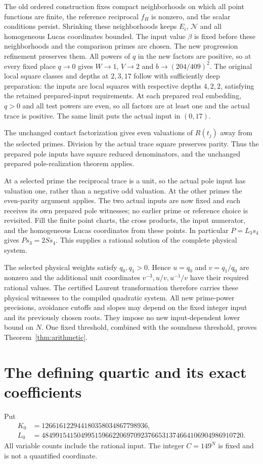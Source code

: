 \documentclass[11pt,a4paper]{article}
\begin{document}
The old ordered construction fixes compact neighborhoods on which all
point functions are finite, the reference reciprocal $f_H$ is nonzero,
and the scalar conditions persist. Shrinking these neighborhoods keeps
$E_i$, $\mathcal N$ and all homogeneous Lucas coordinates bounded.
The input value $\beta$ is fixed before these neighborhoods and the
comparison primes are chosen. The new progression refinement
preserves them. All powers of $q$ in the new factors are positive,
so at every fixed place $q\to0$ gives $W\to1$, $V\to2$ and
$b\to(204/409)^2$. The original local square classes and depths at
$2,3,17$ follow with sufficiently deep preparation: the inputs are
local squares with respective depths $4,2,2$, satisfying the retained
prepared-input requirements. At each prepared
real embedding, $q>0$ and all test powers are even, so all factors
are at least one and the actual trace is positive. The same limit
puts the actual input in $(0,17)$.

The unchanged contact factorization gives even valuations of $R(t_j)$
away from the selected primes. Division by the actual trace square preserves
parity. Thus the prepared pole inputs have square reduced denominators,
and the unchanged prepared pole-realization theorem applies.

At a selected prime the reciprocal trace is a unit, so the actual
pole input has valuation one, rather than a negative odd valuation.
At the other primes the even-parity argument applies. The two actual
inputs are now fixed and each receives its own prepared pole witnesses;
no earlier prime or reference choice is revisited. Fill the finite
point charts, the cross products, the input numerator, and the
homogeneous Lucas coordinates from these points. In particular
$P=L_3s_4$ gives $P s_3=2S s_4$. This supplies a rational solution
of the complete physical system.

The selected physical weights satisfy $q_0,q_1>0$. Hence $u=q_0$
and $v=q_1/q_0$ are nonzero and the additional unit coordinates
$v^{-3},u/v,u^{-1}/v$ have their required rational values. The
certified Laurent transformation therefore carries these physical
witnesses to the compiled quadratic system. All new prime-power
precisions, avoidance cutoffs and slopes may depend on the fixed
integer input and its previously chosen roots. They impose no new
input-dependent lower bound on $N$. One fixed threshold, combined
with the soundness threshold, proves Theorem~\ref{thm:arithmetic}.

\section{The defining quartic and its exact coefficients}\label{sec:quartic193-algebra}
Put
\[
 \begin{aligned}
 K_0&=126616122944180358034867798936,\\
 L_0&=484991541504995159662206970923766531374664106904986910720.
 \end{aligned}
\]
All variable counts include the rational input. The integer $C=149^N$ is
fixed and is not a quantified coordinate.
\end{document}
